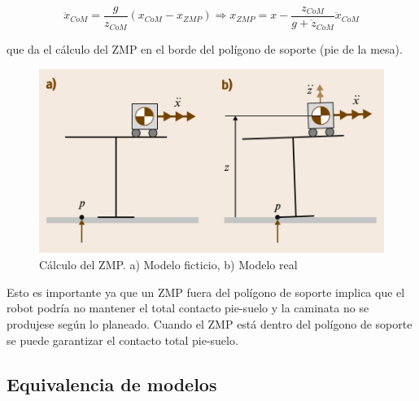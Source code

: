 \begin{equation}
\ddot{x}_{CoM}=\frac{g}{z_{CoM}}\left ( x_{CoM} - x_{ZMP} \right )\Rightarrow x_{ZMP} = x-\frac{z_{CoM}}{g+\ddot{z}_{CoM}}\ddot{x}_{CoM}
\label{ec427}
\end{equation}

que da el cálculo del ZMP en el borde del polígono de soporte (pie de la mesa). 

\begin{figure}[H]
\centering
\includegraphics[scale=0.6]{imagenes/apartado_4/47_cart_table_real}
\caption{Cálculo del ZMP. a) Modelo ficticio, b) Modelo real}
\label{figura47}
\end{figure}

Esto es importante ya que un ZMP fuera del polígono de soporte implica que el robot podría no mantener el total contacto pie-suelo y la caminata no se produjese según lo planeado. Cuando el ZMP está dentro del polígono de soporte se puede garantizar el contacto total pie-suelo.

\newpage

\subsection{Equivalencia de modelos}

